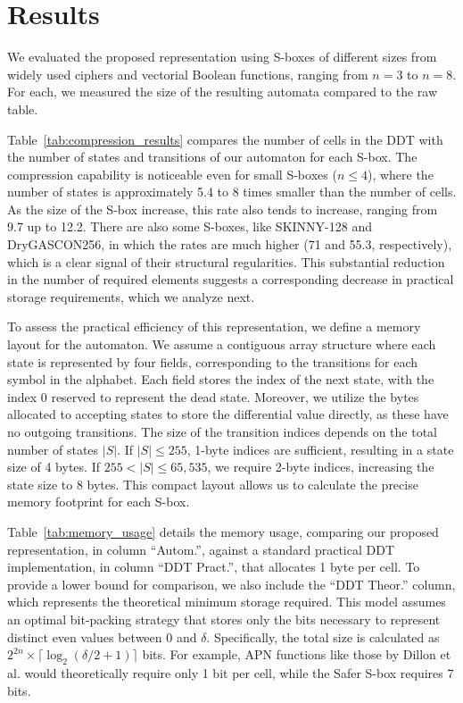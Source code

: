 \section{Results}
\label{sec:results}

We evaluated the proposed representation using S-boxes of different sizes from widely used ciphers and vectorial Boolean functions, ranging from $n = 3$ to $n = 8$. For each, we measured the size of the resulting automata compared to the raw table.



Table~\ref{tab:compression_results} compares the number of cells in the DDT with the number of states and transitions of our automaton for each S-box. The compression capability is noticeable even for small S-boxes ($n \leq 4$), where the number of states is approximately 5.4 to 8 times smaller than the number of cells. As the size of the S-box increase, this rate also tends to increase, ranging from 9.7 up to 12.2. There are also some S-boxes, like SKINNY-128 and DryGASCON256, in which the rates are much higher (71 and 55.3, respectively), which is a clear signal of their structural regularities. This substantial reduction in the number of required elements suggests a corresponding decrease in practical storage requirements, which we analyze next.

To assess the practical efficiency of this representation, we define a memory layout for the automaton. We assume a contiguous array structure where each state is represented by four fields, corresponding to the transitions for each symbol in the alphabet. Each field stores the index of the next state, with the index 0 reserved to represent the dead state. Moreover, we utilize the bytes allocated to accepting states to store the differential value directly, as these have no outgoing transitions. The size of the transition indices depends on the total number of states $|S|$. If $|S| \leq 255$, 1-byte indices are sufficient, resulting in a state size of 4 bytes. If $255 < |S| \leq 65,535$, we require 2-byte indices, increasing the state size to 8 bytes. This compact layout allows us to calculate the precise memory footprint for each S-box.



Table~\ref{tab:memory_usage} details the memory usage, comparing our proposed representation, in column ``Autom.'', against a standard practical DDT implementation, in column ``DDT Pract.'', that allocates 1 byte per cell. To provide a lower bound for comparison, we also include the ``DDT Theor.'' column, which represents the theoretical minimum storage required. This model assumes an optimal bit-packing strategy that stores only the bits necessary to represent distinct even values between $0$ and $\delta$. Specifically, the total size is calculated as $2^{2n} \times \lceil \log_{2}(\delta / 2 + 1) \rceil$ bits. For example, APN functions like those by Dillon et al. would theoretically require only 1 bit per cell, while the Safer S-box requires 7 bits.

